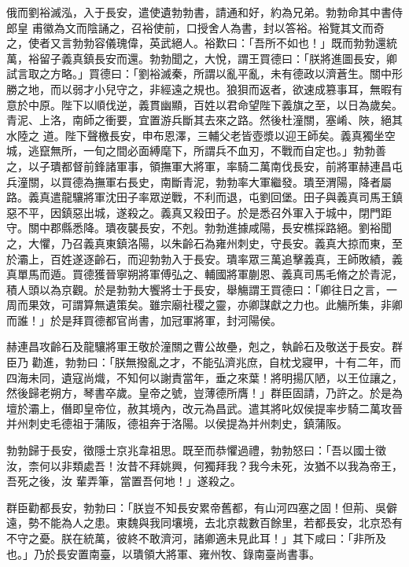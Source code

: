 \begin{pinyinscope}
 俄而劉裕滅泓，入于長安，遣使遺勃勃書，請通和好，約為兄弟。勃勃命其中書侍郎皇
 甫徽為文而陰誦之，召裕使前，口授舍人為書，封以答裕。裕覽其文而奇之，使者又言勃勃容儀瑰偉，英武絕人。裕歎曰：「吾所不如也！」既而勃勃還統萬，裕留子義真鎮長安而還。勃勃聞之，大悅，謂王買德曰：「朕將進圖長安，卿試言取之方略。」買德曰：「劉裕滅秦，所謂以亂平亂，未有德政以濟蒼生。關中形勝之地，而以弱才小兒守之，非經遠之規也。狼狽而返者，欲速成篡事耳，無暇有意於中原。陛下以順伐逆，義貫幽顯，百姓以君命望陛下義旗之至，以日為歲矣。青泥、上洛，南師之衝要，宜置游兵斷其去來之路。然後杜潼關，塞崤、陜，絕其水陸之
 道。陛下聲檄長安，申布恩澤，三輔父老皆壺漿以迎王師矣。義真獨坐空城，逃竄無所，一旬之間必面縛麾下，所謂兵不血刃，不戰而自定也。」勃勃善之，以子璝都督前鋒諸軍事，領撫軍大將軍，率騎二萬南伐長安，前將軍赫連昌屯兵潼關，以買德為撫軍右長史，南斷青泥，勃勃率大軍繼發。璝至渭陽，降者屬路。義真遣龍驤將軍沈田子率眾逆戰，不利而退，屯劉回堡。田子與義真司馬王鎮惡不平，因鎮惡出城，遂殺之。義真又殺田子。於是悉召外軍入于城中，閉門距守。關中郡縣悉降。璝夜襲長安，不剋。勃勃進據咸陽，長安樵採路絕。劉裕聞
 之，大懼，乃召義真東鎮洛陽，以朱齡石為雍州刺史，守長安。義真大掠而東，至於灞上，百姓遂逐齡石，而迎勃勃入于長安。璝率眾三萬追擊義真，王師敗績，義真單馬而遁。買德獲晉寧朔將軍傅弘之、輔國將軍蒯恩、義真司馬毛脩之於青泥，積人頭以為京觀。於是勃勃大饗將士于長安，舉觴謂王買德曰：「卿往日之言，一周而果效，可謂算無遺策矣。雖宗廟社稷之靈，亦卿謀獻之力也。此觴所集，非卿而誰！」於是拜買德都官尚書，加冠軍將軍，封河陽侯。



 赫連昌攻齡石及龍驤將軍王敬於潼關之曹公故壘，剋之，執齡石及敬送于長安。群臣乃
 勸進，勃勃曰：「朕無撥亂之才，不能弘濟兆庶，自枕戈寢甲，十有二年，而四海未同，遺寇尚熾，不知何以謝責當年，垂之來葉！將明揚仄陋，以王位讓之，然後歸老朔方，琴書卒歲。皇帝之號，豈薄德所膺！」群臣固請，乃許之。於是為壇於灞上，僭即皇帝位，赦其境內，改元為昌武。遣其將叱奴侯提率步騎二萬攻晉并州刺史毛德祖于蒲阪，德祖奔于洛陽。以侯提為并州刺史，鎮蒲阪。



 勃勃歸于長安，徵隱士京兆韋祖思。既至而恭懼過禮，勃勃怒曰：「吾以國士徵汝，柰何以非類處吾！汝昔不拜姚興，何獨拜我？我今未死，汝猶不以我為帝王，吾死之後，汝
 輩弄筆，當置吾何地！」遂殺之。



 群臣勸都長安，勃勃曰：「朕豈不知長安累帝舊都，有山河四塞之固！但荊、吳僻遠，勢不能為人之患。東魏與我同壤境，去北京裁數百餘里，若都長安，北京恐有不守之憂。朕在統萬，彼終不敢濟河，諸卿適未見此耳！」其下咸曰：「非所及也。」乃於長安置南臺，以璝領大將軍、雍州牧、錄南臺尚書事。




\end{pinyinscope}
